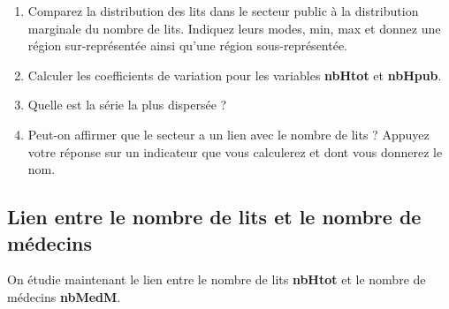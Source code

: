 \documentclass[a4paper,11pt]{article}
\begin{document}
\begin{enumerate}

\item Comparez la distribution des lits dans le secteur public à la distribution marginale du nombre de lits. Indiquez leurs modes, min, max et donnez une région sur-représentée ainsi qu'une région sous-représentée.


\item Calculer les coefficients de variation pour les variables \textbf{nbHtot} et \textbf{nbHpub}.


\item Quelle est la série la plus dispersée ?


\item Peut-on affirmer que le secteur a un lien avec le nombre de lits ? Appuyez votre réponse sur un indicateur que vous calculerez et dont vous donnerez le nom.


\end{enumerate}


\subsection{Lien entre le nombre de lits et le nombre de médecins}

On étudie maintenant le lien entre le nombre de lits  \textbf{nbHtot} et le nombre de médecins \textbf{nbMedM}.
\end{document}
